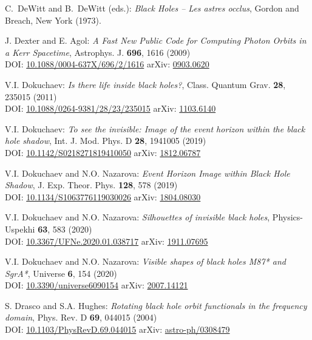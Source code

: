 \begin{thebibliography}{123}
C.~DeWitt and B.~DeWitt (eds.):
{\em Black Holes -- Les astres occlus},
Gordon and Breach, New York (1973).

J. Dexter and E. Agol:
{\em A Fast New Public Code for Computing Photon Orbits in a Kerr Spacetime},
Astrophys. J. {\bf 696}, 1616 (2009)\\
DOI: \href{https://doi.org/10.1088/0004-637X/696/2/1616}{10.1088/0004-637X/696/2/1616}\hfill
arXiv: \href{https://arxiv.org/abs/0903.0620}{0903.0620}

V.I. Dokuchaev: {\em Is there life inside black holes?},
Class. Quantum Grav. {\bf 28}, 235015 (2011)\\
DOI: \href{https://doi.org/10.1088/0264-9381/28/23/235015}{10.1088/0264-9381/28/23/235015}\hfill
arXiv: \href{https://arxiv.org/abs/1103.6140}{1103.6140}

V.I. Dokuchaev: {\em To see the invisible: Image of the event horizon within the black hole shadow},
Int. J. Mod. Phys. D {\bf 28}, 1941005 (2019)\\
DOI: \href{https://doi.org/10.1142/S0218271819410050}{10.1142/S0218271819410050}\hfill
arXiv: \href{https://arxiv.org/abs/1812.06787}{1812.06787}

V.I. Dokuchaev and N.O. Nazarova: {\em Event Horizon Image within Black Hole Shadow},
J. Exp. Theor. Phys. {\bf 128}, 578 (2019)\\
DOI: \href{https://doi.org/10.1134/S1063776119030026}{10.1134/S1063776119030026}\hfill
arXiv: \href{https://arxiv.org/abs/1804.08030}{1804.08030}

V.I. Dokuchaev and N.O. Nazarova: {\em Silhouettes of invisible black holes},
Physics-Uspekhi {\bf 63}, 583 (2020)\\
DOI: \href{https://doi.org/10.3367/UFNe.2020.01.038717}{10.3367/UFNe.2020.01.038717}\hfill
arXiv: \href{https://arxiv.org/abs/1911.07695}{1911.07695}

V.I. Dokuchaev and N.O. Nazarova: {\em Visible shapes of black holes M87* and SgrA*},
Universe {\bf 6}, 154 (2020)\\
DOI: \href{https://doi.org/10.3390/universe6090154}{10.3390/universe6090154}\hfill
arXiv: \href{https://arxiv.org/abs/2007.14121}{2007.14121}

S. Drasco and S.A. Hughes:
{\em Rotating black hole orbit functionals in the frequency domain},
Phys. Rev. D {\bf 69}, 044015 (2004)\\
DOI: \href{https://doi.org/10.1103/PhysRevD.69.044015}{10.1103/PhysRevD.69.044015}\hfill
arXiv: \href{https://arxiv.org/abs/astro-ph/0308479}{astro-ph/0308479}


\end{thebibliography}
